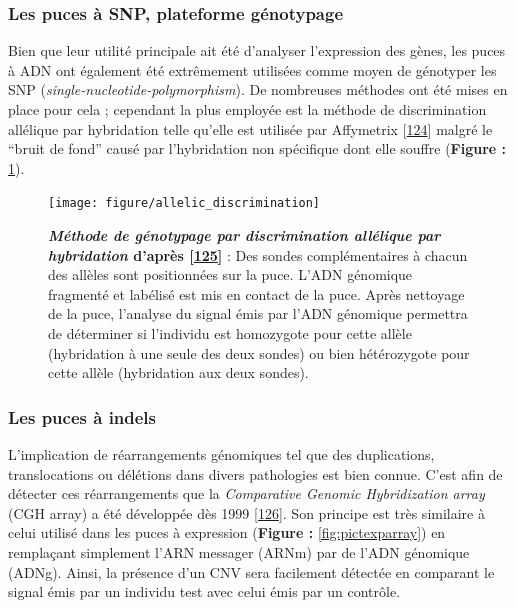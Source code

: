 \documentclass[12pt,a4paper,twoside]{ugathesis}
\theoremstyle{definition}
\theoremstyle{definition}
\theoremstyle{definition}
\theoremstyle{remark}
\begin{document}
\newpage

\subsubsection{Les puces à SNP, plateforme
génotypage}\label{les-puces-a-snp-plateforme-genotypage}

Bien que leur utilité principale ait été d'analyser l'expression des
gènes, les puces à ADN ont également été extrêmement utilisées comme
moyen de génotyper les SNP (\emph{single-nucleotide-polymorphism}). De
nombreuses méthodes ont été mises en place pour cela ; cependant la plus
employée est la méthode de discrimination allélique par hybridation
telle qu'elle est utilisée par Affymetrix
{[}\protect\hyperlink{ref-Wang1998}{124}{]} malgré le ``bruit de fond''
causé par l'hybridation non spécifique dont elle souffre (\textbf{Figure
:} \ref{fig:pictallelicdisc}).

\begin{figure}

{\centering \texttt{[image: figure/allelic\_discrimination]} 

}

\caption[Méthode de génotypage par discrimination allélique par hybridation]{\textbf{\emph{Méthode de génotypage par
discrimination allélique par hybridation} d'après
{[}\protect\hyperlink{ref-Bumgarner2013}{125}{]}} : Des sondes
complémentaires à chacun des allèles sont positionnées sur la puce.
L'ADN génomique fragmenté et labélisé est mis en contact de la puce.
Après nettoyage de la puce, l'analyse du signal émis par l'ADN génomique
permettra de déterminer si l'individu est homozygote pour cette allèle
(hybridation à une seule des deux sondes) ou bien hétérozygote pour
cette allèle (hybridation aux deux sondes).}\label{fig:pictallelicdisc}
\end{figure}











\newpage

\subsubsection{Les puces à indels}\label{les-puces-a-indels}

L'implication de réarrangements génomiques tel que des duplications,
translocations ou délétions dans divers pathologies est bien connue.
C'est afin de détecter ces réarrangements que la \emph{Comparative
Genomic Hybridization array} (CGH array) a été développée dès 1999
{[}\protect\hyperlink{ref-Brown1999}{126}{]}. Son principe est très
similaire à celui utilisé dans les puces à expression (\textbf{Figure :}
\ref{fig:pictexparray}) en remplaçant simplement l'ARN messager (ARNm)
par de l'ADN génomique (ADNg). Ainsi, la présence d'un CNV sera
facilement détectée en comparant le signal émis par un individu test
avec celui émis par un contrôle.
\end{document}
